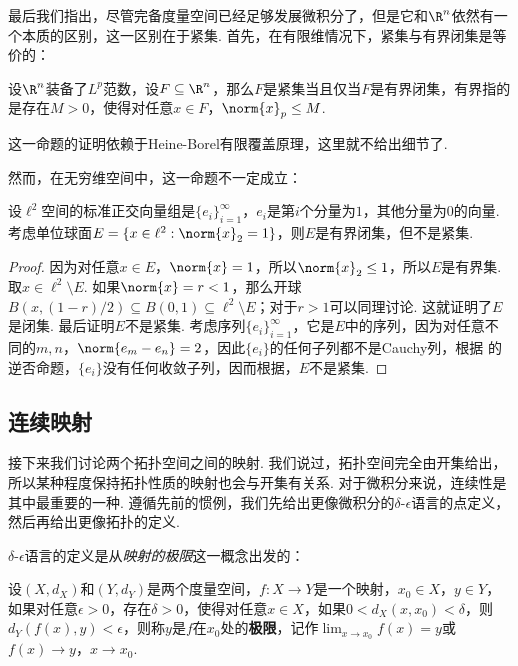 最后我们指出，尽管完备度量空间已经足够发展微积分了，但是它和$\R^n$依然有一个本质的区别，这一区别在于紧集. 首先，在有限维情况下，紧集与有界闭集是等价的：

\begin{theorem}\label{thm:compact-bounded}
设$\R^n$装备了$L^p$范数，设$F\subseteq\R^n$，那么$F$是紧集当且仅当$F$是有界闭集，有界指的是存在$M>0$，使得对任意$x\in F$，$\norm{x}_p\leq M$.
\end{theorem}

这一命题的证明依赖于Heine-Borel有限覆盖原理，这里就不给出细节了. 

然而，在无穷维空间中，这一命题不一定成立：

\begin{proposition}\label{prop:compact-not-bounded}
设$\ell^2$空间的标准正交向量组是$\{e_i\}_{i=1}^\infty$，$e_i$是第$i$个分量为$1$，其他分量为$0$的向量. 考虑单位球面$E=\{x\in\ell^2:\norm{x}_2=1\}$，则$E$是有界闭集，但不是紧集. 
\end{proposition}
\begin{proof}
    因为对任意$x\in E$，$\norm{x}=1$，所以$\norm{x}_2\leq 1$，所以$E$是有界集. 取$x\in\ell^2\setminus E$. 如果$\norm{x}=r<1$，那么开球$B(x,(1-r)/2)\subseteq B(0,1)\subseteq \ell^2\setminus E$；对于$r>1$可以同理讨论. 这就证明了$E$是闭集. 最后证明$E$不是紧集. 考虑序列$\{e_i\}_{i=1}^\infty$，它是$E$中的序列，因为对任意不同的$m,n$，$\norm{e_m-e_n}=2$，因此$\{e_i\}$的任何子列都不是Cauchy列，根据 的逆否命题，$\{e_i\}$没有任何收敛子列，因而根据，$E$不是紧集. 
\end{proof}

\subsection{连续映射}
接下来我们讨论两个拓扑空间之间的映射. 我们说过，拓扑空间完全由开集给出，所以某种程度保持拓扑性质的映射也会与开集有关系. 对于微积分来说，连续性是其中最重要的一种. 遵循先前的惯例，我们先给出更像微积分的$\delta$-$\epsilon$语言的点定义，然后再给出更像拓扑的定义. 

$\delta$-$\epsilon$语言的定义是从\emph{映射的极限}这一概念出发的：

\begin{definition}[映射的极限]
    设$(X,d_X)$和$(Y,d_Y)$是两个度量空间，$f:X\to Y$是一个映射，$x_0\in X$，$y\in Y$，如果对任意$\epsilon>0$，存在$\delta>0$，使得对任意$x\in X$，如果$0<d_X(x,x_0)<\delta$，则$d_Y(f(x),y)<\epsilon$，则称$y$是$f$在$x_0$处的\textbf{极限}，记作$\lim_{x\to x_0}f(x)=y$或$f(x)\to y$，$x\to x_0$.
\end{definition}


